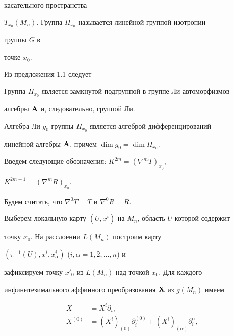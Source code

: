 касательного пространства 


$T_{x_0}(M_n)$. Группа $H_{x_0}$ называется линейной группой изотропии 


группы $G$ в 


точке $x_0$. 


 


Из предложения 1.1 следует 


 


\begin{props} 


Группа $H_{x_0}$ является замкнутой подгруппой в группе Ли автоморфизмов  


алгебры $\bold A$ и, следовательно, группой Ли. 


\end{props} 


 


 


Алгебра Ли $g_0$ группы $H_{x_0}$ является алгеброй дифференцирований 


линейной алгебры $\bold A$, причем $\dim g_0=\dim H_{x_0}$. 


 


Введем следующие обозначения: $K^{2m}=(\nabla^m T)_{x_0}$, 


$K^{2m+1}=(\nabla^m R)_{x_0}$. 


Будем считать, что $\nabla^0T=T$ и $\nabla^0R=R$. 


 


Выберем локальную карту $(U,x^i)$ на $M_n$, область $U$ которой содержит


точку $x_0$. На расслоении $L(M_n)$ построим карту 


$(\pi^{-1}(U),x^i,x^i_\alpha)$ ($i,\alpha=1,2,\dotsc,n$) и 


зафиксируем точку $x'_0$ из $L(M_n)$ над точкой $x_0$. Для каждого 


инфинитезимального аффинного преобразования $\bold X$ из $g(M_n)$ имеем 


\begin{align*} 


X&=X^i\partial_i, \\ 


X^{(0)}&=(X^i)_{(0)}\partial^{(0)}_i 


+(X^i)_{(\alpha)}\partial^\alpha_i, 


\end{align*} 


